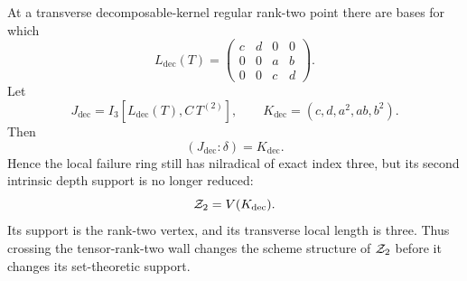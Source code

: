 \begin{theorem}
\label{thm:decomposable-kernel-wall}
At a transverse decomposable-kernel regular rank-two point there are
bases for which
\begin{equation}\label{eq:decomposable-linear-block}
 L_{\mathrm{dec}}(T)=
 \begin{pmatrix}
 c&d&0&0\\
 0&0&a&b\\
 0&0&c&d
 \end{pmatrix}.
\end{equation}
Let
\[
 J_{\mathrm{dec}}
 =I_3[L_{\mathrm{dec}}(T),C\,T^{(2)}],\qquad
 K_{\mathrm{dec}}=(c,d,a^2,ab,b^2).
\]
Then
\begin{equation}\label{eq:decomposable-colon}
 (J_{\mathrm{dec}}:\delta)=K_{\mathrm{dec}}.
\end{equation}
Hence the local failure ring still has nilradical of exact index three,
but its second intrinsic depth support is no longer reduced:
\begin{equation}\label{eq:decomposable-Z2}
 \mathcal Z_2
 =
 V(K_{\mathrm{dec}}).
\end{equation}
Its support is the rank-two vertex, and its transverse local length is
three.  Thus crossing the tensor-rank-two wall changes the
scheme structure of \(\mathcal Z_2\) before it changes its set-theoretic
support.
\end{theorem}

